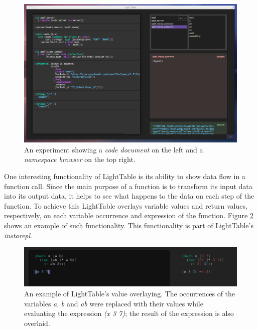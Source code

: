 \documentclass{./llncs2e/llncs}
\begin{document}
	\begin{figure}
	  \centering
	  \includegraphics[width=1.0\textwidth]{img/lt_clojure_table}
	    \caption{An experiment showing a \emph{code document} on the left and a \emph{namespace browser} on the top right.}
	  \label{fig:lt:clojure:table}
	\end{figure} 

	One interesting functionality of LightTable is its ability to show data flow in a function call. Since the main purpose of a function is to transform its input data into its output data, it helps to see what happens to the data on each step of the function. To achieve this LightTable overlays variable values and return values, respectively, on each variable occurrence and expression of the function. Figure \ref{fig:lt:val:overlay} shows an example of such functionality. This functionality is part of LightTable's \emph{instarepl}.

	\begin{figure}
		\centering
		\includegraphics[width=1.0\textwidth]{img/lt_val_overlay}
			\caption{An example of LightTable's value overlaying. The occurrences of the variables \emph{a}, \emph{b} and \emph{ab} were replaced with their values while evaluating the expression \emph{(x 3 7)}; the result of the expression is also overlaid.}
		\label{fig:lt:val:overlay}
	\end{figure}
\end{document}
